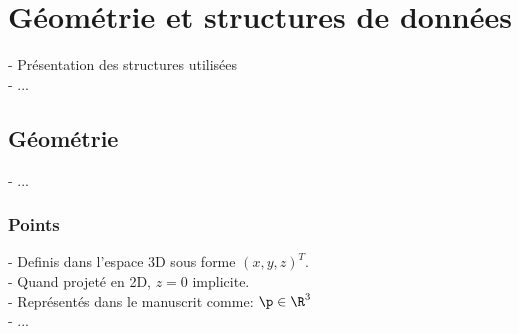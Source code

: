 \section{Géométrie et structures de données}
\label{sec:introduction_geometry-datastructures}
- Présentation des structures utilisées \\
- ... 

\subsection{Géométrie}
- ... 

\subsubsection{Points}
- Definis dans l'espace 3D sous forme $\left( x, y, z \right)^T$. \\
- Quand projeté en 2D, $z = 0$ implicite. \\
- Représentés dans le manuscrit comme: $\p \in \R^3$ \\
- ...

